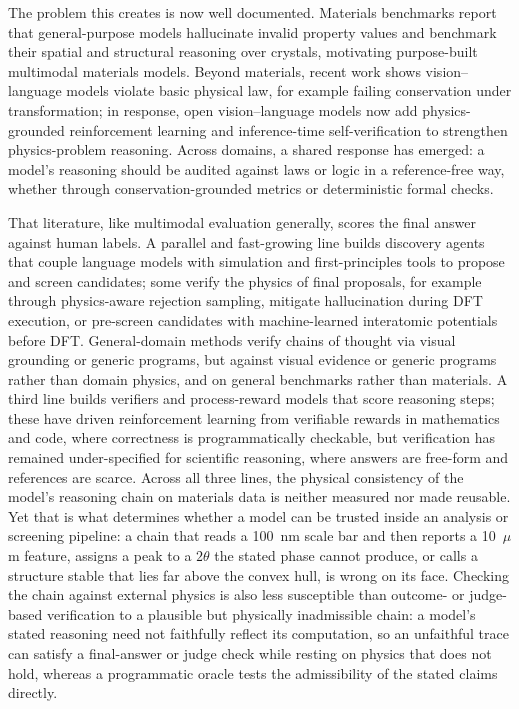 \documentclass[pdflatex,sn-nature]{sn-jnl}
\begin{document}
The problem this creates is now well documented. Materials benchmarks report that
general-purpose models hallucinate invalid property values\cite{llm4matbench2024,lai2025materials}
and benchmark their spatial and structural reasoning over crystals,\cite{atomworld2025}
motivating purpose-built multimodal materials models.\cite{matterchat2026} Beyond
materials, recent work shows vision--language models violate basic physical law,
for example failing conservation under transformation;\cite{conservationbench2026}
in response, open vision--language models now add physics-grounded reinforcement
learning and inference-time self-verification to strengthen physics-problem
reasoning.\cite{p1vl2026} Across domains, a shared response has emerged:
a model's reasoning should be audited against laws or logic in a
reference-free way, whether through conservation-grounded metrics or deterministic
formal checks.\cite{conservationbench2026,neurosymclinical2026}

That literature, like multimodal evaluation generally, scores the final answer
against human labels. A parallel and fast-growing line builds discovery agents that
couple language models with simulation and first-principles tools to propose and
screen candidates;\cite{dreams2025,crystalyse2025,mapps2025,atomagents2024,llmatdesign2024,matpc2025,kang2024chatmof,zhang2024honeycomb,survey2025aimat,eaa2026,matty2026}
some verify the physics of final proposals, for example through physics-aware
rejection sampling,\cite{physrej2025} mitigate hallucination during DFT
execution,\cite{dreams2025} or pre-screen candidates with machine-learned
interatomic potentials before DFT.\cite{genbaselines2025,chgnet2023} General-domain
methods verify chains of thought via visual grounding or generic
programs,\cite{corgi2025,mmverify2025,vlmr3_2026,prove2024} but against visual
evidence or generic programs rather than domain physics, and on general benchmarks
rather than materials. A third line builds verifiers and process-reward models that
score reasoning steps;\cite{processbench2025,compassverifier2025,t1verify2025} these
have driven reinforcement learning from verifiable rewards in mathematics and code,
where correctness is programmatically checkable,\cite{deepseekr1_2025} but
verification has remained under-specified for scientific reasoning, where answers are
free-form and references are scarce.\cite{scirlvr2026} Across all three lines, the
physical consistency of the model's reasoning chain on materials data is neither
measured nor made reusable. Yet that is what
determines whether a model can be trusted inside an analysis or screening pipeline:
a chain that reads a 100~nm scale bar and then reports a 10~$\mu$m feature, assigns
a peak to a $2\theta$ the stated phase cannot produce, or calls a structure stable
that lies far above the convex hull, is wrong on its face. Checking the chain against
external physics is also less susceptible than outcome- or judge-based verification to a
plausible but physically inadmissible chain: a model's stated reasoning need not
faithfully reflect its computation, so an unfaithful trace can satisfy a final-answer or
judge check while resting on physics that does not hold, whereas a programmatic oracle
tests the admissibility of the stated claims directly.\cite{faithflow2026}
\end{document}
